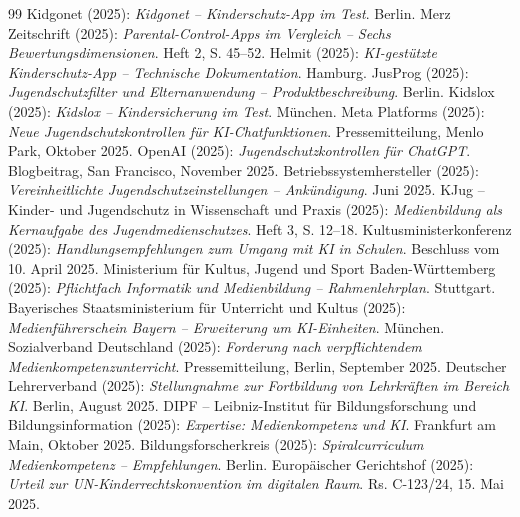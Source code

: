 \documentclass[12pt,a4paper]{article}
\begin{document}
\begin{thebibliography}{99}
		 Kidgonet (2025): \emph{Kidgonet – Kinderschutz-App im Test}. Berlin.
		 Merz Zeitschrift (2025): \emph{Parental-Control-Apps im Vergleich – Sechs Bewertungsdimensionen}. Heft 2, S. 45–52.
		 Helmit (2025): \emph{KI-gestützte Kinderschutz-App – Technische Dokumentation}. Hamburg.
		 JusProg (2025): \emph{Jugendschutzfilter und Elternanwendung – Produktbeschreibung}. Berlin.
		 Kidslox (2025): \emph{Kidslox – Kindersicherung im Test}. München.
		 Meta Platforms (2025): \emph{Neue Jugendschutzkontrollen für KI-Chatfunktionen}. Pressemitteilung, Menlo Park, Oktober 2025.
		 OpenAI (2025): \emph{Jugendschutzkontrollen für ChatGPT}. Blogbeitrag, San Francisco, November 2025.
		 Betriebssystemhersteller (2025): \emph{Vereinheitlichte Jugendschutzeinstellungen – Ankündigung}. Juni 2025.
		 KJug – Kinder- und Jugendschutz in Wissenschaft und Praxis (2025): \emph{Medienbildung als Kernaufgabe des Jugendmedienschutzes}. Heft 3, S. 12–18.
		 Kultusministerkonferenz (2025): \emph{Handlungsempfehlungen zum Umgang mit KI in Schulen}. Beschluss vom 10. April 2025.
		 Ministerium für Kultus, Jugend und Sport Baden-Württemberg (2025): \emph{Pflichtfach Informatik und Medienbildung – Rahmenlehrplan}. Stuttgart.
		 Bayerisches Staatsministerium für Unterricht und Kultus (2025): \emph{Medienführerschein Bayern – Erweiterung um KI-Einheiten}. München.
		 Sozialverband Deutschland (2025): \emph{Forderung nach verpflichtendem Medienkompetenzunterricht}. Pressemitteilung, Berlin, September 2025.
		 Deutscher Lehrerverband (2025): \emph{Stellungnahme zur Fortbildung von Lehrkräften im Bereich KI}. Berlin, August 2025.
		 DIPF – Leibniz-Institut für Bildungsforschung und Bildungsinformation (2025): \emph{Expertise: Medienkompetenz und KI}. Frankfurt am Main, Oktober 2025.
		 Bildungsforscherkreis (2025): \emph{Spiralcurriculum Medienkompetenz – Empfehlungen}. Berlin.
		 Europäischer Gerichtshof (2025): \emph{Urteil zur UN-Kinderrechtskonvention im digitalen Raum}. Rs. C-123/24, 15. Mai 2025.
		

\end{thebibliography}
\end{document}
